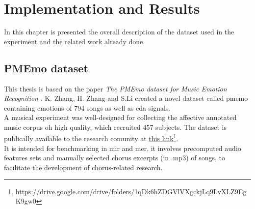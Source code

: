 \chapter{Implementation and Results}
\label{chap:Implementation}
\pagestyle{plain}
\vspace{0.5cm}

\noindent In this chapter is presented the overall description of the dataset used in the experiment and the related work already done.

\section{PMEmo dataset}
This thesis is based on the paper \textit{The PMEmo dataset for Music Emotion Recognition} \cite{zhang2018pmemo}. K. Zhang, H. Zhang and S.Li created a novel dataset called \gls{pmemo} containing emotions of 794 songs as well as \gls{eda} signals.
\\
A musical experiment was well-designed for collecting the affective annotated music corpus oh high quality, which recruited 457 subjects.
The dataset is publically available to the research comunity at \href{https://drive.google.com/drive/folders/1qDk6hZDGVlVXgckjLq9LvXLZ9EgK9gw0}{this link}\footnote{https://drive.google.com/drive/folders/1qDk6hZDGVlVXgckjLq9LvXLZ9EgK9gw0}.
\\
It is intended for benchmarking in \gls{mir} and \gls{mer}, it involves precomputed audio features sets and manually selected chorus excerpts (in .mp3) of songs, to facilitate the development of chorus-related research.

